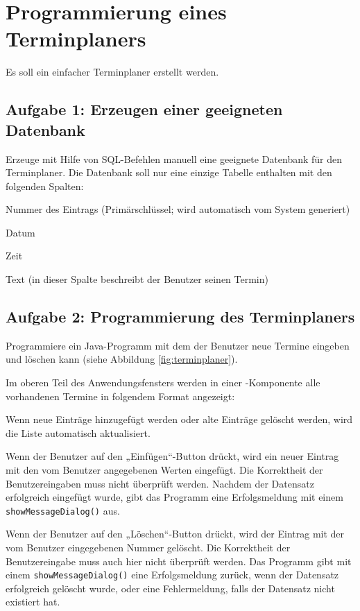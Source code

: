 \section{Programmierung eines Terminplaners}

Es soll ein einfacher Terminplaner erstellt werden.

\subsection{Aufgabe 1: Erzeugen einer geeigneten Datenbank}

Erzeuge mit Hilfe von SQL-Befehlen manuell eine geeignete Datenbank für den
Terminplaner. Die Datenbank soll nur eine einzige Tabelle enthalten mit den
folgenden Spalten:

\begin{compactitem}
\item Nummer des Eintrags (Primärschlüssel; wird automatisch vom System
generiert)
\item Datum
\item Zeit
\item Text (in dieser Spalte beschreibt der Benutzer seinen Termin)
\end{compactitem}


\subsection{Aufgabe 2: Programmierung des Terminplaners}

Programmiere ein Java-Programm mit dem der Benutzer neue Termine eingeben und
löschen kann (siehe Abbildung \ref{fig:terminplaner}).

Im oberen Teil des Anwendungsfensters werden in einer
-Komponente alle vorhandenen Termine in folgendem Format angezeigt:


Wenn neue Einträge hinzugefügt werden oder alte Einträge gelöscht werden, wird
die Liste automatisch aktualisiert.

Wenn der Benutzer auf den „Einfügen“-Button drückt, wird ein neuer Eintrag mit
den vom Benutzer angegebenen Werten eingefügt. Die Korrektheit der
Benutzereingaben muss nicht überprüft werden.
Nachdem der Datensatz erfolgreich eingefügt wurde, gibt das Programm eine
Erfolgsmeldung mit einem \lstinline|showMessageDialog()| aus.

Wenn der Benutzer auf den „Löschen“-Button drückt, wird der Eintrag mit der vom
Benutzer eingegebenen Nummer gelöscht. Die Korrektheit der Benutzereingabe muss
auch hier nicht überprüft werden. Das Programm gibt mit einem
\lstinline|showMessageDialog()| eine Erfolgsmeldung zurück, wenn der Datensatz
erfolgreich gelöscht wurde, oder eine Fehlermeldung, falls der Datensatz nicht
existiert hat.

